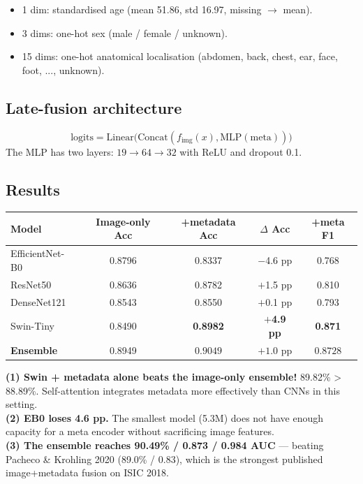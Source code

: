 \documentclass[11pt,a4paper]{article}
\begin{document}
\begin{itemize}[leftmargin=*]
  \item 1 dim: standardised age (mean 51.86, std 16.97, missing $\to$ mean).
  \item 3 dims: one-hot sex (male / female / unknown).
  \item 15 dims: one-hot anatomical localisation (abdomen, back, chest, ear, face, foot, ..., unknown).
\end{itemize}

\subsection{Late-fusion architecture}

\[
  \text{logits} = \text{Linear}\bigl(\text{Concat}(f_{\text{img}}(x), \text{MLP}(\text{meta}))\bigr)
\]
The MLP has two layers: $19 \to 64 \to 32$ with ReLU and dropout 0.1.

\subsection{Results}

\begin{table}[h]
\centering\small
\begin{tabular}{lcccc}
\toprule
\textbf{Model} & \textbf{Image-only Acc} & \textbf{+metadata Acc} & \textbf{$\Delta$ Acc} & \textbf{+meta F1} \\
\midrule
EfficientNet-B0 & 0.8796 & 0.8337 & $-$4.6 pp & 0.768 \\
ResNet50        & 0.8636 & 0.8782 & $+$1.5 pp & 0.810 \\
DenseNet121     & 0.8543 & 0.8550 & $+$0.1 pp & 0.793 \\
Swin-Tiny       & 0.8490 & \textbf{0.8982} & \textbf{$+$4.9 pp} & \textbf{0.871} \\
\midrule
\rowcolor{usthblue!10}
\textbf{Ensemble} & 0.8949 & $\mathbf{0.9049}$ & $\mathbf{+1.0}$ pp & $\mathbf{0.8728}$ \\
\bottomrule
\end{tabular}
\end{table}

\begin{idea}
\textbf{(1) Swin + metadata alone beats the image-only ensemble!} 89.82\% > 88.89\%. Self-attention integrates metadata more effectively than CNNs in this setting.\\
\textbf{(2) EB0 loses 4.6 pp.} The smallest model (5.3M) does not have enough capacity for a meta encoder without sacrificing image features.\\
\textbf{(3) The ensemble reaches 90.49\% / 0.873 / 0.984 AUC} --- beating Pacheco \& Krohling 2020 (89.0\% / 0.83), which is the strongest published image+metadata fusion on ISIC 2018.
\end{idea}
\end{document}
